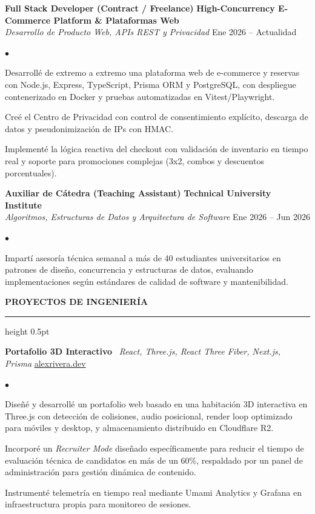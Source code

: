 \documentclass[10pt,letterpaper]{article}
\newcommand{\resumesection}[1]{%
  \vspace{2pt}%
  {\color{primary}\normalsize\bfseries\MakeUppercase{#1}}%
  \vspace{1pt}\hrule height 0.5pt\vspace{2pt}%
}
\renewenvironment{itemize}{%
  \begin{list}{\color{primary}$\bullet$}{%
    \setlength{\leftmargin}{1.1em}%
    \setlength{\itemsep}{0.5pt}%
    \setlength{\topsep}{1pt}%
    \setlength{\parsep}{0pt}%
    \setlength{\partopsep}{0pt}%
  }%
}{%
  \end{list}%
}
\begin{document}
\vspace{1.5pt}

\textbf{Full Stack Developer (Contract / Freelance)} \hfill \textbf{High-Concurrency E-Commerce Platform \& Plataformas Web} \\
\textit{Desarrollo de Producto Web, APIs REST y Privacidad} \hfill Ene 2026 -- Actualidad
\begin{itemize}
    \item Desarrollé de extremo a extremo una plataforma web de e-commerce y reservas con Node.js, Express, TypeScript, Prisma ORM y PostgreSQL, con despliegue contenerizado en Docker y pruebas automatizadas en Vitest/Playwright.
    \item Creé el Centro de Privacidad con control de consentimiento explícito, descarga de datos y pseudonimización de IPs con HMAC.
    \item Implementé la lógica reactiva del checkout con validación de inventario en tiempo real y soporte para promociones complejas (3x2, combos y descuentos porcentuales).
\end{itemize}

\vspace{1.5pt}

\textbf{Auxiliar de Cátedra (Teaching Assistant)} \hfill \textbf{Technical University Institute} \\
\textit{Algoritmos, Estructuras de Datos y Arquitectura de Software} \hfill Ene 2026 -- Jun 2026
\begin{itemize}
    \item Impartí asesoría técnica semanal a más de 40 estudiantes universitarios en patrones de diseño, concurrencia y estructuras de datos, evaluando implementaciones según estándares de calidad de software y mantenibilidad.
\end{itemize}

\resumesection{Proyectos de Ingeniería}

\textbf{Portafolio 3D Interactivo} \textbar\ \textit{React, Three.js, React Three Fiber, Next.js, Prisma} \hfill \href{https://alexrivera.dev}{alexrivera.dev}
\begin{itemize}
    \item Diseñé y desarrollé un portafolio web basado en una habitación 3D interactiva en Three.js con detección de colisiones, audio posicional, render loop optimizado para móviles y desktop, y almacenamiento distribuido en Cloudflare R2.
    \item Incorporé un \textit{Recruiter Mode} diseñado específicamente para reducir el tiempo de evaluación técnica de candidatos en más de un 60\%, respaldado por un panel de administración para gestión dinámica de contenido.
    \item Instrumenté telemetría en tiempo real mediante Umami Analytics y Grafana en infraestructura propia para monitoreo de sesiones.
\end{itemize}
\end{document}
